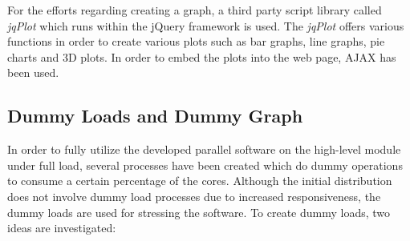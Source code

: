 For the efforts regarding creating a graph, a third party script library called \textit{jqPlot} \cite{jqplot} which runs within the jQuery framework is used.  The \textit{jqPlot} offers various functions in order to create various plots such as bar graphs, line graphs, pie charts and 3D plots. In order to embed the plots into the web page, AJAX has been used.

\subsection{Dummy Loads and Dummy Graph}
In order to fully utilize the developed parallel software on the high-level module under full load, several processes have been created which do dummy operations to consume a certain percentage of the cores. Although the initial distribution does not involve dummy load processes due to increased responsiveness, the dummy loads are used for stressing the software. To create dummy loads, two ideas are investigated:
